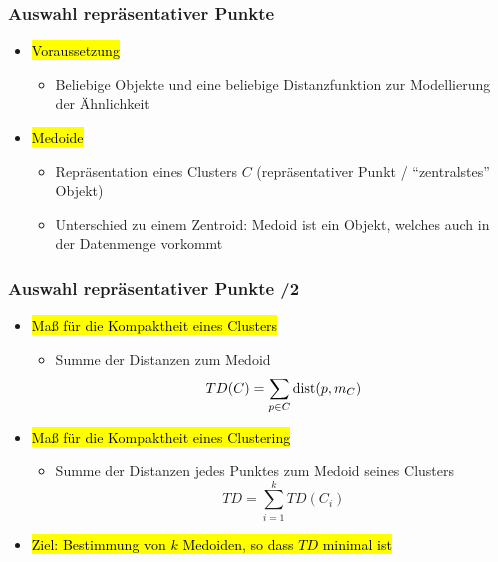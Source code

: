 
\begin{frame}
\frametitle{Auswahl repräsentativer Punkte}

\begin{itemize}
\item\hl{Voraussetzung}
\begin{itemize}
\item Beliebige Objekte und eine beliebige Distanzfunktion zur
  Modellierung der Ähnlichkeit
\end{itemize}
\item\hl{Medoide}
\begin{itemize}
\item Repräsentation eines Clusters $C$ (repräsentativer Punkt /
 "`zentralstes"' Objekt)
\item Unterschied zu einem Zentroid: Medoid ist ein Objekt, welches
  auch in der Datenmenge vorkommt
\end{itemize}
\end{itemize}
\end{frame}


\begin{frame}

\frametitle{Auswahl repräsentativer Punkte /2}

\begin{itemize}
\item\hl{Maß für die Kompaktheit eines Clusters}
\begin{itemize}
\item Summe der Distanzen zum Medoid
$$TD(C) = \sum_{p \in C} \operatorname{dist}(p, m_C)$$
\end{itemize}
\item\hl{Maß für die Kompaktheit eines Clustering}
\begin{itemize}
\item Summe der Distanzen jedes Punktes zum Medoid seines Clusters
$$TD=\sum_{i=1}^k TD(C_i)$$
\end{itemize}
\item\hl{Ziel: Bestimmung von $k$ Medoiden, so dass $TD$ minimal ist}
\end{itemize}
\end{frame}


